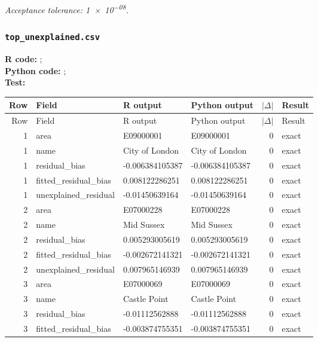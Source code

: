 \documentclass[10pt]{article}
\begin{document}
\normalsize
\textit{Acceptance tolerance: \num{1e-08}.}

\subsubsection{\texorpdfstring{\texttt{top\_unexplained.csv}}{top\_unexplained.csv}}
{\footnotesize \textbf{R code:} ; \\ \textbf{Python code:} ; \\ \textbf{Test:} \par}

\small
\begin{longtable}{@{}r p{}p{}p{}rl@{}}
\toprule
Row & Field & R output & Python output & $|\Delta|$ & Result \\
\midrule
\endfirsthead
\toprule
Row & Field & R output & Python output & $|\Delta|$ & Result \\
\midrule
\endhead
1 & area & E09000001 & E09000001 & 0 & exact \\
1 & name & City of London & City of London & 0 & exact \\
1 & residual\_\allowbreak{}bias & -0.006384105387 & -0.006384105387 & 0 & exact \\
1 & fitted\_\allowbreak{}residual\_\allowbreak{}bias & 0.008122286251 & 0.008122286251 & 0 & exact \\
1 & unexplained\_\allowbreak{}residual & -0.01450639164 & -0.01450639164 & 0 & exact \\
2 & area & E07000228 & E07000228 & 0 & exact \\
2 & name & Mid Sussex & Mid Sussex & 0 & exact \\
2 & residual\_\allowbreak{}bias & 0.005293005619 & 0.005293005619 & 0 & exact \\
2 & fitted\_\allowbreak{}residual\_\allowbreak{}bias & -0.002672141321 & -0.002672141321 & 0 & exact \\
2 & unexplained\_\allowbreak{}residual & 0.007965146939 & 0.007965146939 & 0 & exact \\
3 & area & E07000069 & E07000069 & 0 & exact \\
3 & name & Castle Point & Castle Point & 0 & exact \\
3 & residual\_\allowbreak{}bias & -0.01112562888 & -0.01112562888 & 0 & exact \\
3 & fitted\_\allowbreak{}residual\_\allowbreak{}bias & -0.003874755351 & -0.003874755351 & 0 & exact \\

\end{longtable}
\end{document}
